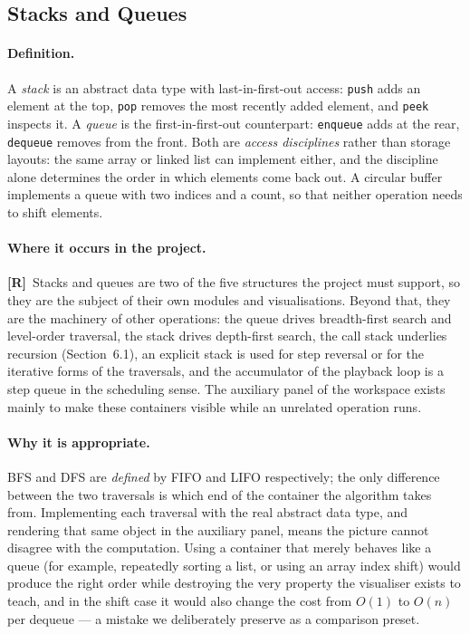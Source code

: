 \documentclass[11pt,a4paper]{article}
\newcommand{\R}{\textcolor{reqc}{\textbf{[R]}}}     %
\newcommand{\ct}[1]{\texttt{#1}}
\begin{document}
\subsection{Stacks and Queues}

\paragraph{Definition.} A \emph{stack} is an abstract data type with last-in-first-out
access: \ct{push} adds an element at the top, \ct{pop} removes the most recently added
element, and \ct{peek} inspects it. A \emph{queue} is the first-in-first-out counterpart:
\ct{enqueue} adds at the rear, \ct{dequeue} removes from the front. Both are \emph{access
disciplines} rather than storage layouts: the same array or linked list can implement either,
and the discipline alone determines the order in which elements come back out. A circular
buffer implements a queue with two indices and a count, so that neither operation needs to
shift elements.

\paragraph{Where it occurs in the project.} \R\ Stacks and queues are two of the five
structures the project must support, so they are the subject of their own modules and
visualisations. Beyond that, they are the machinery of other operations: the queue drives
breadth-first search and level-order traversal, the stack drives depth-first search, the
call stack underlies recursion (Section~6.1), an explicit stack is used for step reversal or
for the iterative forms of the traversals, and the accumulator of the playback loop is a
step queue in the scheduling sense. The auxiliary panel of the workspace exists mainly to
make these containers visible while an unrelated operation runs.

\paragraph{Why it is appropriate.} BFS and DFS are \emph{defined} by FIFO and LIFO
respectively; the only difference between the two traversals is which end of the container
the algorithm takes from. Implementing each traversal with the real abstract data type, and
rendering that same object in the auxiliary panel, means the picture cannot disagree with the
computation. Using a container that merely behaves like a queue (for example, repeatedly
sorting a list, or using an array index shift) would produce the right order while destroying
the very property the visualiser exists to teach, and in the shift case it would also change
the cost from $O(1)$ to $O(n)$ per dequeue --- a mistake we deliberately preserve as a
comparison preset.
\end{document}
